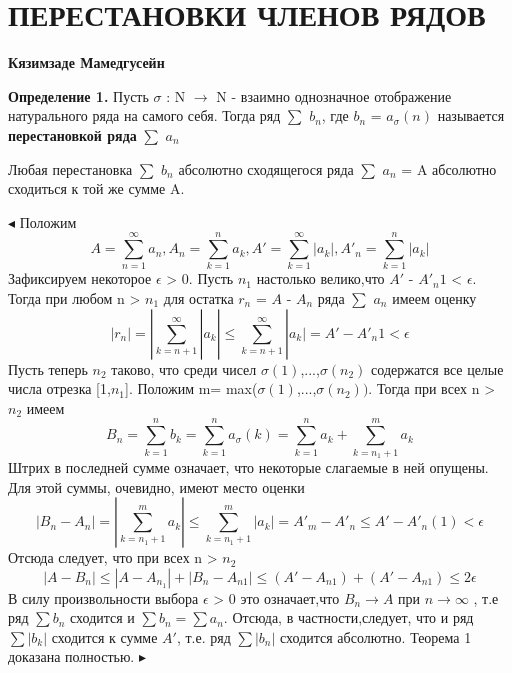 \setcounter{approval}{0}
\setcounter{theorem}{0}
\setcounter{example}{0}
\chapter{ПЕРЕСТАНОВКИ ЧЛЕНОВ РЯДОВ} \vskip -1cm
\centerline{\bf Кязимзаде Мамедгусейн} \vskip 1cm
\par\textbf{Определение 1.} Пусть  	$\sigma$ : N $\rightarrow$ N - взаимно однозначное отображение натурального ряда на самого себя. Тогда ряд $\sum$ $b_n$, где $b_n$ = $a_\sigma(n)$ называется \textbf{перестановкой ряда} $\sum$ $a_n$

\begin{theorem}
Любая перестановка $\sum$ $b_n$ абсолютно сходящегося ряда $\sum$ $a_n$ = A абсолютно сходиться к той же сумме A.
\end{theorem}

$\blacktriangleleft$
Положим
$$A = \sum_{n=1}^\infty a_n, A_n = \sum_{k=1}^n a_k, A' = \sum_{k=1}^\infty |a_k|, A'_n = \sum_{k=1}^n |a_k|$$
Зафиксируем некоторое $\epsilon$ > 0. Пусть $n_1$ настолько велико,что $A'$ - $A'_n1$ < $\epsilon$. Тогда при любом n > $n_1$ для остатка $r_n$ = $A$ - $A_n$ ряда $\sum$ $a_n$ имеем оценку
$$|r_n| = |\sum_{k=n+1}^\infty |a_k| \leq \sum_{k=n+1}^\infty |a_k| = A' - A'_n1 < \epsilon $$
Пусть теперь $n_2$ таково, что среди чисел $\sigma(1)$,...,$\sigma(n_2) $ содержатся все целые числа отрезка [1,$n_1$]. Положим m= max($\sigma(1)$,...,$\sigma(n_2))$. Тогда при всех n > $n_2$ имеем 
$$B_n = \sum_{k=1}^n b_k = \sum_{k=1}^n a_\sigma(k) = \sum_{k=1}^n a_k + \sum_{k=n_1+1}^m a_k$$
Штрих в последней сумме означает, что некоторые слагаемые в ней опущены. Для этой суммы, очевидно, имеют место оценки
$$ |B_n - A_n| = |\sum_{k=n_1+1}^m a_k| \leq \sum_{k=n_1+1}^m |a_k| = A'_m - A'_n  \leq A' - A'_n(1) < \epsilon    $$
Отсюда следует, что при всех n > $n_2$ 
$$|A-B_n| \leq |A-A_{n_1}| + |B_n - A_{n1}| \leq (A' - A_{n1}) + (A' - A_{n1}) \leq 2\epsilon $$
В силу произвольности выбора $\epsilon$ > 0 это означает,что $B_n\rightarrow A$ при $n \rightarrow \infty$ , т.е ряд $\sum b_n$ сходится и $\sum b_n = \sum a_n$. Отсюда, в частности,следует, что и ряд $\sum |b_k|$ сходится к сумме $A'$, т.е. ряд $\sum |b_n|$ сходится абсолютно. Теорема 1 доказана полностью.
$\blacktriangleright$

